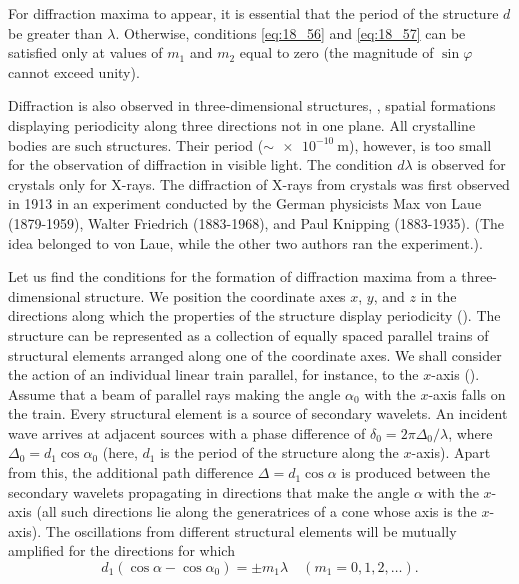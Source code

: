 For diffraction maxima to appear, it is essential that the period of the structure $d$ be greater than $\lambda$.
Otherwise, conditions \eqref{eq:18_56} and \eqref{eq:18_57} can be satisfied only at values of $m_1$ and $m_2$ equal to zero (the magnitude of $\sin\varphi$ cannot exceed unity).

Diffraction is also observed in three-dimensional structures, \ie, spatial formations displaying periodicity along three directions not in one plane.
All crystalline bodies are such structures. Their period ($\sim\SI{e-10}{\metre}$), however, is too small for the observation of diffraction in visible light.
The condition $d\lambda$ is observed for crystals only for X-rays.
The diffraction of X-rays from crystals was first observed in 1913 in an experiment conducted by the German physicists Max von Laue (1879-1959), Walter Friedrich (1883-1968), and Paul Knipping (1883-1935).
(The idea belonged to von Laue, while the other two authors ran the experiment.).

Let us find the conditions for the formation of diffraction maxima from a three-dimensional structure.
We position the coordinate axes $x$, $y$, and $z$ in the directions along which the properties of the structure display periodicity ().
The structure can be represented as a collection of equally spaced parallel trains of structural elements arranged along one of the coordinate axes.
We shall consider the action of an individual linear train parallel, for instance, to the $x$-axis ().
Assume that a beam of parallel rays making the angle $\alpha_0$ with the $x$-axis falls on the train.
Every structural element is a source of secondary wavelets.
An incident wave arrives at adjacent sources with a phase difference of $\delta_0=2\pi \Delta_0/\lambda$, where $\Delta_0=d_1 \cos\alpha_0$ (here, $d_1$ is the period of the structure along the $x$-axis).
Apart from this, the additional path difference $\Delta=d_1\cos\alpha$ is produced between the secondary wavelets propagating in directions that make the angle $\alpha$ with the $x$-axis (all such directions lie along the generatrices of a cone whose axis is the $x$-axis).
The oscillations from different structural elements will be mutually amplified for the directions for which
\begin{equation}\label{eq:18_58}
	d_1 (\cos\alpha - \cos\alpha_0) = \pm m_1 \lambda \quad (m_1 = 0,1,2,\ldots).
\end{equation}

